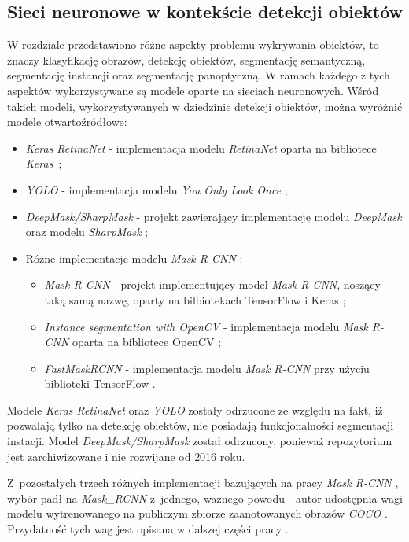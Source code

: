 \subsection{Sieci neuronowe w kontekście detekcji obiektów}

W rozdziale  przedstawiono różne aspekty problemu wykrywania obiektów, to znaczy klasyfikację obrazów, detekcję obiektów, segmentację semantyczną, segmentację instancji oraz segmentację panoptyczną. W ramach każdego z tych aspektów wykorzystywane są modele oparte na sieciach neuronowych. Wśród takich modeli, wykorzystywanych w dziedzinie detekcji obiektów, można wyróżnić modele otwartoźródłowe:

\begin{itemize}
	\item \textit{Keras RetinaNet} \cite{keras-retinanet-implementation} - implementacja modelu \textit{RetinaNet} \cite{keras-retinanet} oparta na bibliotece \textit{Keras}~\cite{keras};
	\item \textit{YOLO} \cite{yolo-implementation} - implementacja modelu \textit{You Only Look Once} \cite{yolo};
	\item \textit{DeepMask/SharpMask} \cite{deep-sharp-mask} - projekt zawierający implementację modelu \textit{DeepMask} \cite{deepmask} oraz modelu \textit{SharpMask} \cite{sharpmask};
	\item Różne implementacje modelu \textit{Mask R-CNN} \cite{general-mask-rcnn}:
		\begin{itemize}
			\item \textit{Mask R-CNN} \cite{matterport-mask-rcnn} - projekt implementujący model \textit{Mask R-CNN}, noszący taką samą nazwę, oparty na bilbiotekach TensorFlow \cite{tensorflow} i Keras \cite{keras};
			\item \textit{Instance segmentation with OpenCV} \cite{mask-rcnn-opencv} - implementacja modelu \textit{Mask R-CNN} oparta na bibliotece OpenCV \cite{opencv};
			\item \textit{FastMaskRCNN} \cite{fast-mask-rcnn} - implementacja modelu \textit{Mask R-CNN} przy użyciu biblioteki TensorFlow \cite{tensorflow}.
		\end{itemize}
\end{itemize}

Modele \textit{Keras RetinaNet} oraz \textit{YOLO} zostały odrzucone ze względu na fakt, iż pozwalają tylko na detekcję obiektów, nie posiadają funkcjonalności segmentacji instacji.
Model \textit{DeepMask/SharpMask} został odrzucony, ponieważ repozytorium jest zarchiwizowane i nie rozwijane od 2016 roku.

Z~pozostałych trzech różnych implementacji bazujących na pracy \textit{Mask R-CNN} \cite{general-mask-rcnn}, wybór padł na \textit{Mask\_RCNN} \cite{matterport-mask-rcnn} z~jednego, ważnego powodu - autor udostępnia wagi modelu wytrenowanego na publiczym zbiorze zaanotowanych obrazów \textit{COCO} \cite{coco}.
Przydatność tych wag jest opisana w dalszej części pracy .

